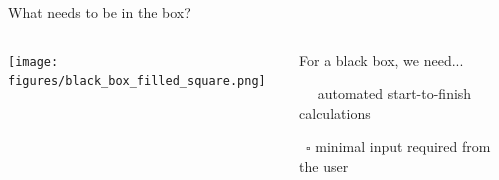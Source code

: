 \documentclass[xcolor=table,aspectratio=169]{beamer}
\numberwithin{equation}{section}
\begin{document}
\begin{frame}{What needs to be in the box?}

   \begin{columns}
      \begin{column}{0.5\textwidth}
         \texttt{[image: figures/black\_box\_filled\_square.png]}
      \end{column}
      \begin{column}{0.5\textwidth}
         For a black box, we need...

         \vspace{1ex}
         \
         \only<1>{$\square$}%
         \only<2->{%
            \rlap{$\square$}{\raisebox{2pt}{\large\hspace{1pt}\ding{51}}}%
            \hspace{-1.5pt}}%
         \ automated start-to-finish calculations

         \vspace{1ex}
         \ $\square$ minimal input required from the user
      \end{column}
   \end{columns}
\end{frame}
% 
\end{document}
